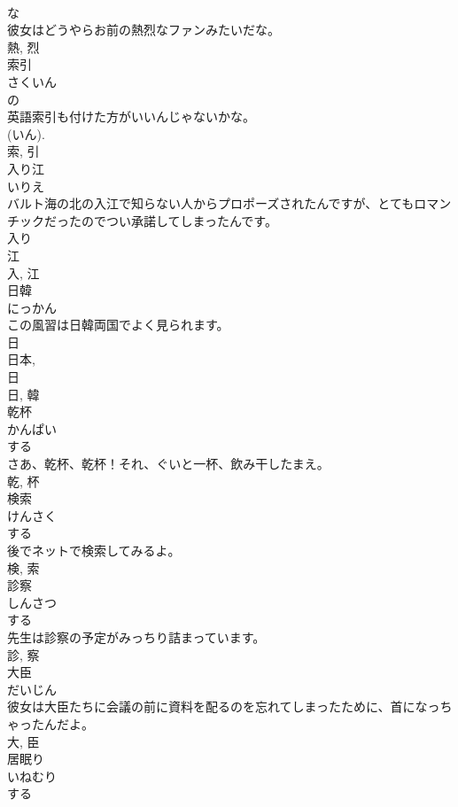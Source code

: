 \documentclass[8pt]{extreport}
\begin{document}
\begin{CJK}{UTF8}{min}
\\	な 
\\	彼女はどうやらお前の熱烈なファンみたいだな。	
\\	熱, 烈	
\\	索引	
\\	さくいん	
\\	の 
\\	英語索引も付けた方がいいんじゃないかな。	
\\	(いん). 
\\	索, 引	
\\	入り江	
\\	いりえ	
\\	バルト海の北の入江で知らない人からプロポーズされたんですが、とてもロマンチックだったのでつい承諾してしまったんです。	
\\	入り 
\\	江 
\\	入, 江	
\\	日韓	
\\	にっかん	
\\	この風習は日韓両国でよく見られます。	
\\	日 
\\	日本, 
\\	日 
\\	日, 韓	
\\	乾杯	
\\	かんぱい	
\\	する 
\\	さあ、乾杯、乾杯！それ、ぐいと一杯、飲み干したまえ。	
\\	乾, 杯	
\\	検索	
\\	けんさく	
\\	する 
\\	後でネットで検索してみるよ。	
\\	検, 索	
\\	診察	
\\	しんさつ	
\\	する 
\\	先生は診察の予定がみっちり詰まっています。	
\\	診, 察	
\\	大臣	
\\	だいじん	
\\	彼女は大臣たちに会議の前に資料を配るのを忘れてしまったために、首になっちゃったんだよ。	
\\	大, 臣	
\\	居眠り	
\\	いねむり	
\\	する 

\end{CJK}
\end{document}

